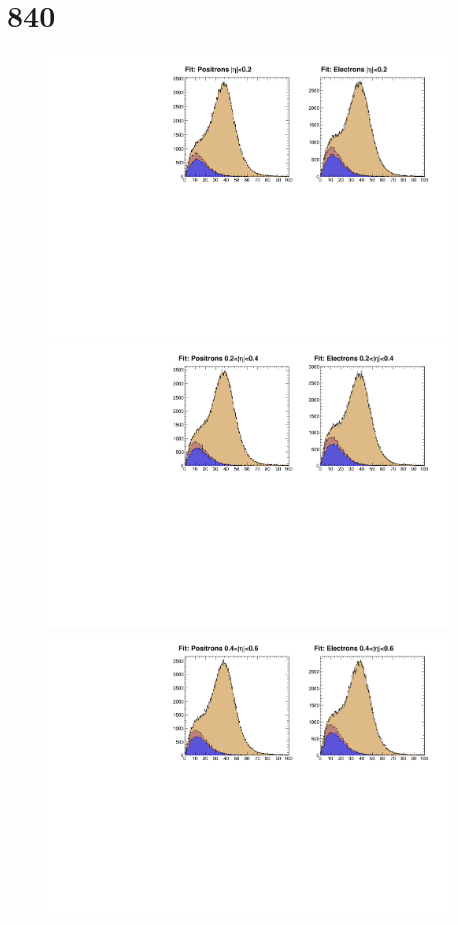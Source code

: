 \clearpage

\section{\unit{840}{\invpb}}

\begin{figure}
\begin{center}
\includegraphics[width=0.95\textwidth]{data_0.pdf} \\
\includegraphics[width=0.95\textwidth]{data_1.pdf} \\
\includegraphics[width=0.95\textwidth]{data_2.pdf}

\end{center}
\end{figure}

